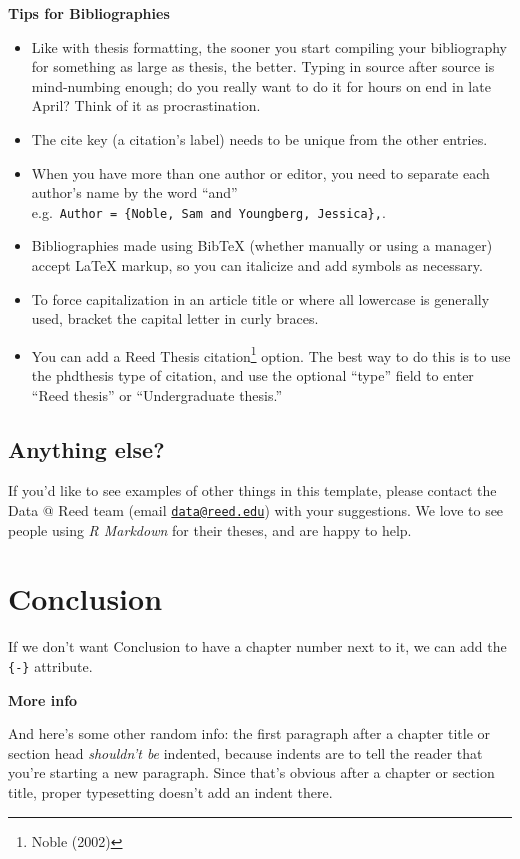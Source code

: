 \documentclass[12pt,twoside]{reedthesis}
\providecommand{\tightlist}{%
  \setlength{\itemsep}{0pt}\setlength{\parskip}{0pt}}
\begin{document}
\textbf{Tips for Bibliographies}
\begin{itemize}
\tightlist
\item
  Like with thesis formatting, the sooner you start compiling your bibliography for something as large as thesis, the better. Typing in source after source is mind-numbing enough; do you really want to do it for hours on end in late April? Think of it as procrastination.
\item
  The cite key (a citation's label) needs to be unique from the other entries.
\item
  When you have more than one author or editor, you need to separate each author's name by the word ``and'' e.g.~\texttt{Author\ =\ \{Noble,\ Sam\ and\ Youngberg,\ Jessica\},}.
\item
  Bibliographies made using BibTeX (whether manually or using a manager) accept LaTeX markup, so you can italicize and add symbols as necessary.
\item
  To force capitalization in an article title or where all lowercase is generally used, bracket the capital letter in curly braces.
\item
  You can add a Reed Thesis citation\footnote{Noble (2002)} option. The best way to do this is to use the phdthesis type of citation, and use the optional ``type'' field to enter ``Reed thesis'' or ``Undergraduate thesis.''
\end{itemize}
\hypertarget{anything-else}{%
\section{Anything else?}\label{anything-else}}

If you'd like to see examples of other things in this template, please contact the Data @ Reed team (email \href{mailto:data@reed.edu}{\nolinkurl{data@reed.edu}}) with your suggestions. We love to see people using \emph{R Markdown} for their theses, and are happy to help.

\hypertarget{conclusion}{%
\chapter*{Conclusion}\label{conclusion}}

If we don't want Conclusion to have a chapter number next to it, we can add the \texttt{\{-\}} attribute.

\textbf{More info}

And here's some other random info: the first paragraph after a chapter title or section head \emph{shouldn't be} indented, because indents are to tell the reader that you're starting a new paragraph. Since that's obvious after a chapter or section title, proper typesetting doesn't add an indent there.
\end{document}
